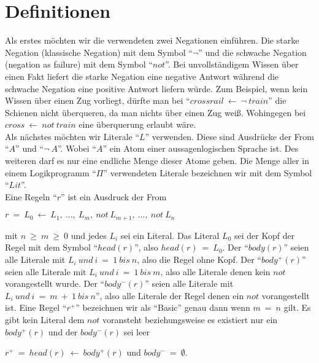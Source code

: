 \section{Definitionen}

Als erstes möchten wir die verwendeten zwei Negationen einführen. Die starke Negation (klassische Negation) mit dem Symbol ``$\neg$'' und die schwache Negation (negation as failure) mit dem Symbol ``$not$''. Bei unvollständigem Wissen über einen Fakt liefert die starke Negation eine negative Antwort während die schwache Negation eine positive Antwort liefern würde. Zum Beispiel, wenn kein Wissen über einen Zug vorliegt, dürfte man bei ``$cross rail~\leftarrow~\neg~train$'' die Schienen nicht überqueren, da man nichts über einen Zug weiß. Wohingegen bei $cross~\leftarrow~not~train$ eine überquerung erlaubt wäre.\\

Als nächstes möchten wir Literale ``$L$'' verwenden. Diese sind Ausdrücke der From ``$A$'' und ``$\neg~A$''. Wobei ``$A$'' ein Atom einer aussagenlogischen Sprache ist. Des weiteren darf es nur eine endliche Menge dieser Atome geben. Die Menge aller in einem Logikprogramm ``$\Pi$'' verwendeten Literale bezeichnen wir mit dem Symbol ``$Lit$''.\\

Eine Regeln ``$r$'' ist ein Ausdruck der From

\begin{center}
	$r~=~L_0~\leftarrow~L_1,~...,~L_m,~not~L_{m+1},~...,~not~L_n$\\
\end{center}

mit $n~\geq~m~\geq~0$ und jedes $L_i$ sei ein Literal. Das Literal $L_0$ sei der Kopf der Regel mit dem Symbol ``$head(r)$'', also $head(r)~=~L_0$. Der ``$body(r)$'' seien alle Literale mit $L_i~und~i~=~1~bis~n$, also die Regel ohne Kopf. Der ``$body^+(r)$'' seien alle Literale mit $L_i~und~i~=~1~bis~m$, also alle Literale denen kein $not$ vorangestellt wurde. Der ``$body^-(r)$'' seien alle Literale mit $L_i~und~i~=~m~+~1~bis~n$'', also alle Literale der Regel denen ein $not$ vorangestellt ist.
Eine Regel ``$r^+$'' bezeichnen wir als ``Basic'' genau dann wenn $m~=~n$ gilt. Es gibt kein Literal dem $not$ voransteht beziehungsweise es existiert nur ein $body^+(r)$ und der $body^-(r)$ sei leer 

\begin{center}
	$r^+~=~head(r)~\leftarrow~body^+(r)$ und $body^-~=~\emptyset$. \\
\end{center}	

